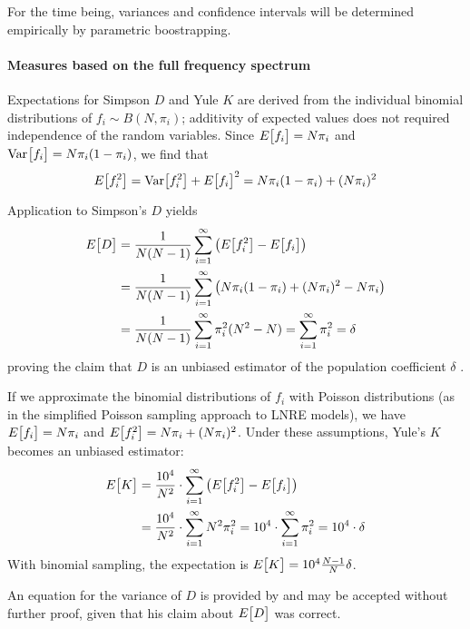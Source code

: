 \documentclass[a4paper]{article}
\begin{document}
For the time being, variances and confidence intervals will be determined
empirically by parametric boostrapping.

\paragraph*{Measures based on the full frequency spectrum}
Expectations for Simpson $D$ and Yule $K$ are derived from the individual
binomial distributions of $f_i \sim B(N, \pi_i)$; additivity of expected
values does not required independence of the random variables.  Since
$E_{}\bigl[f_i\bigr] = N \pi_i$ and $\mathop{\mathrm{Var}}_{}\bigl[f_i\bigr] = N \pi_i (1 - \pi_i)$, we find that
\begin{equation}
  \label{eq:prod:exp-D-1}
  E_{}\bigl[f_i^2\bigr] = \mathop{\mathrm{Var}}_{}\bigl[f_i^2\bigr] + E_{}\bigl[f_i\bigr]^2 = N \pi_i (1 - \pi_i) + (N \pi_i)^2
\end{equation}
Application to Simpson's $D$ yields
\begin{align*}
  E_{}\bigl[D\bigr] & = \frac1{N(N-1)} \sum_{i=1}^{\infty} \left( E_{}\bigl[f_i^2\bigr] - E_{}\bigl[f_i\bigr] \right)\\
          & = \frac1{N(N-1)} \sum_{i=1}^{\infty} \left( N \pi_i (1 - \pi_i) + (N \pi_i)^2 - N \pi_i \right)\\
          & = \frac1{N(N-1)} \sum_{i=1}^{\infty} \pi_i^2 (N^2 - N)
            = \sum_{i=1}^{\infty} \pi_i^2 = \delta
\end{align*}
proving the claim that $D$ is an unbiased estimator of the population
coefficient $\delta$ \citep[688]{Simpson:49}.  

If we approximate the binomial distributions of $f_i$ with Poisson
distributions (as in the simplified Poisson sampling approach to LNRE models),
we have $E_{}\bigl[f_i\bigr] = N \pi_i$ and $E_{}\bigl[f_i^2\bigr] = N \pi_i + (N \pi_i)^2$. Under
these assumptions, Yule's $K$ becomes an unbiased estimator:
\begin{align*}
  E_{}\bigl[K\bigr] & = \frac{10^4}{N^2} \cdot \sum_{i=1}^{\infty} \left( E_{}\bigl[f_i^2\bigr] - E_{}\bigl[f_i\bigr] \right) \\
          & = \frac{10^4}{N^2} \cdot \sum_{i=1}^{\infty} N^2 \pi_i^2
            = 10^4 \cdot \sum_{i=1}^{\infty} \pi_i^2 = 10^4 \cdot \delta
\end{align*}
With binomial sampling, the expectation is $E_{}\bigl[K\bigr] = 10^4 \frac{N - 1}{N} \delta$.

An equation for the variance of $D$ is provided by \citet[688]{Simpson:49} and
may be accepted without further proof, given that his claim about $E_{}\bigl[D\bigr]$
was correct.


\end{document}
